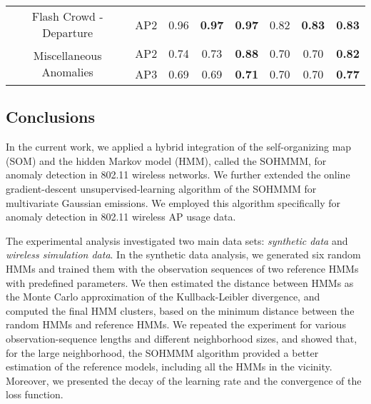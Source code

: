 \begin{table*}[h]
\begin{tabular}{cc|ccc|ccc|}
	\multicolumn{1}{|c|}{\multirow{2}{*}{Flash Crowd - Departure}} &
	\multicolumn{1}{c|}{\multirow{2}{*}{AP2}} & 
	\multirow{2}{*}{0.96} & \multirow{2}{*}{\textbf{0.97}} & \multirow{2}{*}{\textbf{0.97}} & \multirow{2}{*}{0.82} & \multirow{2}{*}{\textbf{0.83}} & \multirow{2}{*}{\textbf{0.83}}\\
	\multicolumn{1}{|c|}{}                        &
	\multicolumn{1}{c|}{} & & & & & & \\ \cline{3-8}
	\hline
		
	\multicolumn{1}{|c|}{\multirow{2}{*}{Miscellaneous Anomalies}} &
	\multicolumn{1}{c|}{AP2} & 0.74 & 0.73 & \textbf{0.88} & 0.70 & 0.70 & \textbf{0.82}  \\ \cline{2-8}
	\multicolumn{1}{|c|}{}                        &
	\multicolumn{1}{c|}{AP3} & 0.69 & 0.69 & \textbf{0.71} & 0.70 & 0.70 & \textbf{0.77} \\ \cline{3-8}
	\hline
		
\end{tabular}
\end{table*}

\subsection{Conclusions}
\label{sec:sohmmm_conclusions}

In the current work, we applied a hybrid integration of the self-organizing map (SOM) and the hidden Markov model (HMM), called the SOHMMM, for anomaly detection in 802.11 wireless networks. We further extended the online gradient-descent unsupervised-learning algorithm of the SOHMMM for multivariate Gaussian emissions. We employed this algorithm specifically for anomaly detection in 802.11 wireless AP usage data. 

The experimental analysis investigated two main data sets: \textit{synthetic data} and \textit{wireless simulation data}. In the synthetic data analysis, we generated six random HMMs and trained them with the observation sequences of two reference HMMs with predefined parameters. We then estimated the distance between HMMs as the Monte Carlo approximation of the Kullback-Leibler divergence, and computed the final HMM clusters, based on the minimum distance between the random HMMs and reference HMMs. We repeated the experiment for various observation-sequence lengths and different neighborhood sizes, and showed that, for the large neighborhood, the SOHMMM algorithm provided a better estimation of the reference models, including all the HMMs in the vicinity. Moreover, we presented the decay of the learning rate and the convergence of the loss function.

